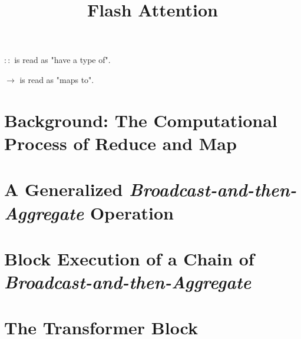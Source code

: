 \documentclass{article}
\title{Flash Attention}
\begin{document}


\maketitle %
\tableofcontents

\clearpage
\noindent
\linespread{1.2}
\selectfont
\setlength{\topskip}{0ex}
\setlength{\parskip}{1ex}
\setlength{\lineskip}{1em}


\noindent $::$ is read as "have a type of".

\noindent $\rightarrow$ is read as "maps to".

\section{Background: The Computational Process of Reduce and Map}\label{sec1}


\section{A Generalized \textit{Broadcast-and-then-Aggregate} Operation}


\section{Block Execution of a Chain of \textit{Broadcast-and-then-Aggregate}}


\section{The Transformer Block}

\clearpage
\begin{appendices}


\end{appendices}

\clearpage


\end{document}
